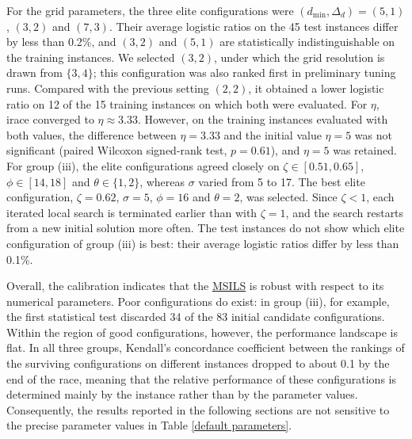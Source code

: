 \documentclass{article}
\begin{document}
For the grid parameters, the three elite configurations were $(d_{\min},\Delta_d)=(5,1)$, $(3,2)$ and $(7,3)$. Their average logistic ratios on the 45 test instances differ by less than 0.2\%, and $(3,2)$ and $(5,1)$ are statistically indistinguishable on the training instances. We selected $(3,2)$, under which the grid resolution is drawn from $\{3,4\}$; this configuration was also ranked first in preliminary tuning runs. Compared with the previous setting $(2,2)$, it obtained a lower logistic ratio on 12 of the 15 training instances on which both were evaluated. For $\eta$, irace converged to $\eta\approx3.33$. However, on the training instances evaluated with both values, the difference between $\eta=3.33$ and the initial value $\eta=5$ was not significant (paired Wilcoxon signed-rank test, $p=0.61$), and $\eta=5$ was retained. For group (iii), the elite configurations agreed closely on $\zeta\in[0.51,0.65]$, $\phi\in[14,18]$ and $\theta\in\{1,2\}$, whereas $\sigma$ varied from 5 to 17. The best elite configuration, $\zeta=0.62$, $\sigma=5$, $\phi=16$ and $\theta=2$, was selected. Since $\zeta<1$, each iterated local search is terminated earlier than with $\zeta=1$, and the search restarts from a new initial solution more often. The test instances do not show which elite configuration of group (iii) is best: their average logistic ratios differ by less than 0.1\%.

Overall, the calibration indicates that the \hyperref[alg:MSILS]{MSILS} is robust with respect to its numerical parameters. Poor configurations do exist: in group (iii), for example, the first statistical test discarded 34 of the 83 initial candidate configurations. Within the region of good configurations, however, the performance landscape is flat. In all three groups, Kendall's concordance coefficient between the rankings of the surviving configurations on different instances dropped to about 0.1 by the end of the race, meaning that the relative performance of these configurations is determined mainly by the instance rather than by the parameter values. Consequently, the results reported in the following sections are not sensitive to the precise parameter values in Table \ref{default parameters}.
\end{document}
